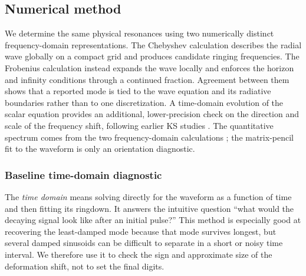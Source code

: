 \documentclass[12pt,a4paper]{article}
\begin{document}
\subsection{Numerical method}

\color{blue}
We determine the same physical resonances using two numerically distinct
frequency-domain representations.  The Chebyshev calculation describes the radial wave globally
on a compact grid and produces candidate ringing frequencies.  The Frobenius
calculation instead expands the wave locally and enforces the horizon and
infinity conditions through a continued fraction.  Agreement between them
shows that a reported mode is tied to the wave equation and its radiative
boundaries rather than to one discretization.  A time-domain evolution of the
scalar equation provides an additional, lower-precision check on the direction
and scale of the frequency shift, following earlier KS studies
\cite{Konoplya2020}.  The quantitative spectrum comes from the two
frequency-domain calculations \cite{Leaver1985,Jansen2017}; the matrix-pencil
fit to the waveform is only an orientation diagnostic.
\color{black}

\subsubsection{Baseline time-domain diagnostic}
\color{blue}

The \emph{time domain} means solving directly for the waveform as a function
of time and then fitting its ringdown.  It answers the intuitive question
``what would the decaying signal look like after an initial pulse?''  This
method is especially good at recovering the least-damped mode because that
mode survives longest, but several damped sinusoids can be difficult to
separate in a short or noisy time interval.  We therefore use it to check the
sign and approximate size of the deformation shift, not to set the final
digits.
\color{black}
\end{document}

